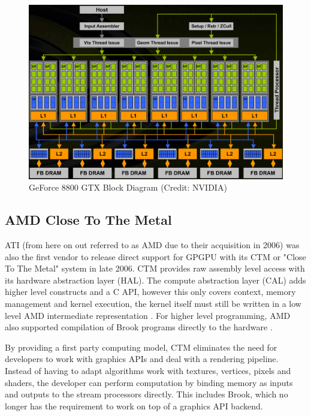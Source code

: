 \begin{figure}[ht]
    \centering
    \includegraphics[width=\textwidth]{img/geforce-8800-block-diagram.png}
    \captionsetup{justification=centering}
    \caption{GeForce 8800 GTX Block Diagram (Credit: NVIDIA)}
    \label{fig:8800-arch}
\end{figure}

\subsection{AMD Close To The Metal}

ATI (from here on out referred to as AMD due to their acquisition in 2006) was also the first vendor to release direct support for GPGPU with its CTM or "Close To The Metal" system in late 2006. CTM provides raw assembly level access with its hardware abstraction layer (HAL). The compute abstraction layer (CAL) adds higher level constructs and a C API, however this only covers context, memory management and kernel execution, the kernel itself must still be written in a low level AMD intermediate representation \cite{amd_ctm_programming_guide}. For higher level programming, AMD also supported compilation of Brook programs directly to the hardware \cite{gpu_computing}.

By providing a first party computing model, CTM eliminates the need for developers to work with graphics APIs and deal with a rendering pipeline. Instead of having to adapt algorithms work with textures, vertices, pixels and shaders, the developer can perform computation by binding memory as inputs and outputs to the stream processors directly. This includes Brook, which no longer has the requirement to work on top of a graphics API backend.

